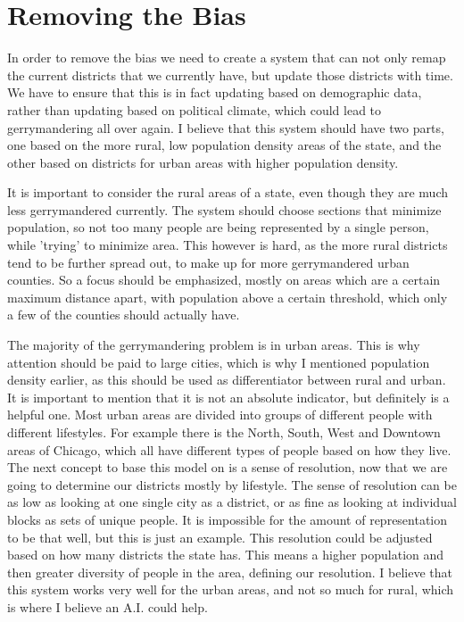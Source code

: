 \documentclass[12pt]{article}
\begin{document}
\section{Removing the Bias}
In order to remove the bias we need to create a system that can not only remap the current districts that we currently have, but update those districts with time. We have to ensure that this is in fact updating based on demographic data, rather than updating based on political climate, which could lead to gerrymandering all over again. I believe that this system should have two parts, one based on the more rural, low population density areas of the state, and the other based on districts for urban areas with higher population density.

It is important to consider the rural areas of a state, even though they are much less gerrymandered currently. The system should choose sections that minimize population, so not too many people are being represented by a single person, while 'trying' to minimize area. This however is hard, as the more rural districts tend to be further spread out, to make up for more gerrymandered urban counties. So a focus should be emphasized, mostly on areas which are a certain maximum distance apart, with population above a certain threshold, which only a few of the counties should actually have.

The majority of the gerrymandering problem is in urban areas. This is why attention should be paid to large cities, which is why I mentioned population density earlier, as this should be used as differentiator between rural and urban. It is important to mention that it is not an absolute indicator, but definitely is a helpful one. Most urban areas are divided into groups of different people with different lifestyles. For example there is the North, South, West and Downtown areas of Chicago, which all have different types of people based on how they live. The next concept to base this model on is a sense of resolution, now that we are going to determine our districts mostly by lifestyle. The sense of resolution can be as low as looking at one single city as a district, or as fine as looking at individual blocks as sets of unique people. It is impossible for the amount of representation to be that well, but this is just an example. This resolution could be adjusted based on how many districts the state has. This means a higher population and then greater diversity of people in the area, defining our resolution. I believe that this system works very well for the urban areas, and not so much for rural, which is where I believe an A.I. could help.
\end{document}
